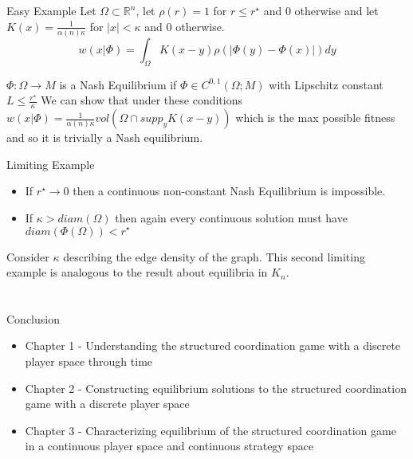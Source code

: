 \documentclass{beamer}
\begin{document}
\begin{frame}{Easy Example}
	Let $\Omega \subset \mathbb{R}^n$, let $\rho(r)=1$ for $r\leq r^\star$ and $0$ otherwise and let $K(x)=\frac{1}{\alpha(n)\kappa}$ for $|x|<\kappa$ and $0$ otherwise. 
	\begin{equation}
		w(x|\Phi)=\int_\Omega K(x-y)\rho(|\Phi(y)-\Phi(x)|)dy
	\end{equation} 

	\begin{block}{$\Phi:\Omega\to M$ is a Nash Equilibrium if $\Phi\in C^{0,1}(\Omega;M)$ with Lipschitz constant $L\leq \frac{r^\star}{\kappa}$}
		We can show that under these conditions $w(x|\Phi)=\frac{1}{\alpha(n)\kappa} vol(\Omega\cap supp_y K(x-y))$ which is the max possible fitness and so it is trivially a Nash equilibrium. 
	\end{block}
\end{frame}

\begin{frame}{Limiting Example}
	\begin{itemize}
		\item If $r^\star\rightarrow0$ then a continuous non-constant Nash Equilibrium is impossible.
		
		\item If $\kappa > diam(\Omega)$ then again every continuous solution must have $diam (\Phi(\Omega))<r^\star$
	\end{itemize}
	Consider $\kappa$ describing the edge density of the graph. This second limiting example is analogous to the result about equilibria in $K_n$.
	 
\end{frame}

\section*{}
\begin{frame}{Conclusion}
	\begin{itemize}
		\item Chapter 1 - Understanding the structured coordination game with a discrete player space through time
		\item Chapter 2 - Constructing equilibrium solutions to the structured coordination game with a discrete player space
		\item Chapter 3 - Characterizing equilibrium of the structured coordination game in a continuous player space and continuous strategy space
	\end{itemize}
\end{frame} 
\end{document}
